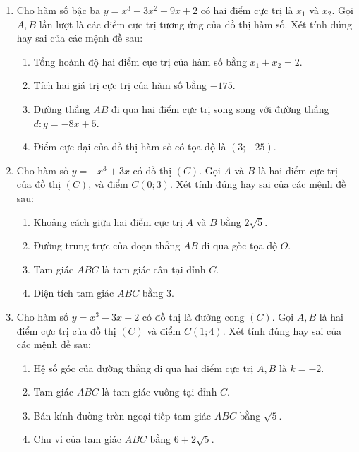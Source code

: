 \documentclass[12pt]{article}
\begin{document}
\begin{enumerate}[label=\textbf{Câu \arabic*.}]
		\item Cho hàm số bậc ba $y = x^3 - 3x^2 - 9x + 2$ có hai điểm cực trị là $x_1$ và $x_2$. Gọi $A, B$ lần lượt là các điểm cực trị tương ứng của đồ thị hàm số. Xét tính đúng hay sai của các mệnh đề sau:
		\begin{enumerate}[label=\alph*)]
			\item Tổng hoành độ hai điểm cực trị của hàm số bằng $x_1 + x_2 = 2$.
			\item Tích hai giá trị cực trị của hàm số bằng $-175$.
			\item Đường thẳng $AB$ đi qua hai điểm cực trị song song với đường thẳng $d: y = -8x + 5$.
			\item Điểm cực đại của đồ thị hàm số có tọa độ là $(3; -25)$.
		\end{enumerate}
		
		\item Cho hàm số $y = -x^3 + 3x$ có đồ thị $(C)$. Gọi $A$ và $B$ là hai điểm cực trị của đồ thị $(C)$, và điểm $C(0; 3)$. Xét tính đúng hay sai của các mệnh đề sau:
		\begin{enumerate}[label=\alph*)]
			\item Khoảng cách giữa hai điểm cực trị $A$ và $B$ bằng $2\sqrt{5}$.
			\item Đường trung trực của đoạn thẳng $AB$ đi qua gốc tọa độ $O$.
			\item Tam giác $ABC$ là tam giác cân tại đỉnh $C$.
			\item Diện tích tam giác $ABC$ bằng $3$.
		\end{enumerate}
		
		\item Cho hàm số $y = x^3 - 3x + 2$ có đồ thị là đường cong $(C)$. Gọi $A, B$ là hai điểm cực trị của đồ thị $(C)$ và điểm $C(1; 4)$. Xét tính đúng hay sai của các mệnh đề sau:
		\begin{enumerate}[label=\alph*)]
			\item Hệ số góc của đường thẳng đi qua hai điểm cực trị $A, B$ là $k = -2$.
			\item Tam giác $ABC$ là tam giác vuông tại đỉnh $C$.
			\item Bán kính đường tròn ngoại tiếp tam giác $ABC$ bằng $\sqrt{5}$.
			\item Chu vi của tam giác $ABC$ bằng $6 + 2\sqrt{5}$.
		\end{enumerate}
		

\end{enumerate}
\end{document}
